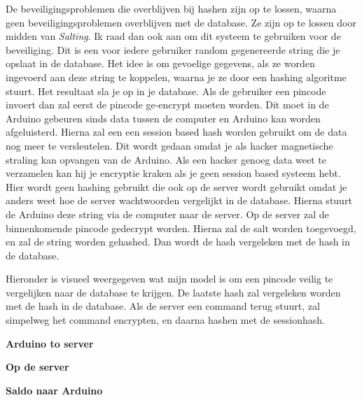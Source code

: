 \documentclass{article}
\begin{document}
De beveiligingsproblemen die overblijven bij hashen zijn op te lossen, waarna geen beveiligingsproblemen overblijven met de database.
Ze zijn op te lossen door midden van \emph{Salting}.
Ik raad dan ook aan om dit systeem te gebruiken voor de beveiliging.
Dit is een voor iedere gebruiker random gegenereerde string die je opslaat in de database.
Het idee is om gevoelige gegevens, als ze worden ingevoerd aan deze string te koppelen, waarna je ze door een hashing algoritme stuurt.
Het resultaat sla je op in je database.
Als de gebruiker een pincode invoert dan zal eerst de pincode ge-encrypt moeten worden.
Dit moet in de Arduino gebeuren sinds data tussen de computer en Arduino kan worden afgeluisterd.
Hierna zal een een session based hash worden gebruikt om de data nog meer te versleutelen.
Dit wordt gedaan omdat je als hacker magnetische straling kan opvangen van de Arduino.
Als een hacker genoeg data weet te verzamelen kan hij je encryptie kraken als je geen session based systeem hebt.
Hier wordt geen hashing gebruikt die ook op de server wordt gebruikt omdat je anders weet hoe de server wachtwoorden vergelijkt in de database.
Hierna stuurt de Arduino deze string via de computer naar de server.
Op de server zal de binnenkomende pincode gedecrypt worden.
Hierna zal de salt worden toegevoegd, en zal de string worden gehashed.
Dan wordt de hash vergeleken met de hash in de database.

Hieronder is visueel weergegeven wat mijn model is om een pincode veilig te vergelijken naar de database te krijgen. De laatste hash zal vergeleken worden met de hash in de database.
Als de server een command terug stuurt, zal simpelweg het command encrypten, en daarna hashen met de sessionhash.

\hfill

\centerline{\textbf{Arduino to server} }

\vspace{1cm}

\centerline{\textbf{Op de server} }

\vspace{1cm}

\centerline{\textbf{Saldo naar Arduino} }
\end{document}
